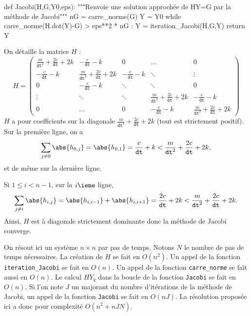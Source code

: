 \question{}

\begin{pyverbatim}
def Jacobi(H,G,Y0,eps):
    """Renvoie une solution approchée de HY=G par la méthode de Jacobi"""
    nG = carre_norme(G)
    Y = Y0
    while carre_norme(H.dot(Y)-G) > eps**2 * nG : 
        Y = iteration_Jacobi(H,G,Y)
    return Y
\end{pyverbatim}

\question{}
On détaille la matrice $H$ : 
\begin{equation*}
  H = \begin{pmatrix}
        \frac{m}{\texttt{dt}^2} + \frac{2c}{\texttt{dt}} + 2k & -\frac{c}{\texttt{dt}} - k & 0 & \dots & 0 \\
        -\frac{c}{\texttt{dt}} - k                            & \frac{m}{\texttt{dt}^2} + \frac{2c}{\texttt{dt}} + 2k & -\frac{c}{\texttt{dt}} - k & \ddots & \vdots  \\
        0 & -\frac{c}{\texttt{dt}} - k & \ddots & \ddots & 0 \\
        \vdots & \ddots & \ddots &\frac{m}{\texttt{dt}^2} + \frac{2c}{\texttt{dt}} + 2k & -\frac{c}{\texttt{dt}} - k \\
        0 & \dots & 0 & -\frac{c}{\texttt{dt}} - k & \frac{m}{\texttt{dt}^2} + \frac{2c}{\texttt{dt}} + 2k 
      \end{pmatrix}
\end{equation*}
$H$ a pour coefficients sur la diagonale $\frac{m}{\texttt{dt}^2} + \frac{2c}{\texttt{dt}} + 2k$ (tout est strictement positif). 
Sur la première ligne, on a 
\begin{equation*}
  \sum_{j\neq 0} \abs{h_{0,j}} = \abs{h_{0,1}} = \frac{c}{\texttt{dt}} + k < \frac{m}{\texttt{dt}^2} + \frac{2c}{\texttt{dt}} + 2k,
\end{equation*}
et de même sur la dernière ligne.

Si $1 \leq i < n-1$, sur la $i\ieme$ ligne,
\begin{equation*}
  \sum_{j\neq i} \abs{h_{i,j}} = \abs{h_{i,i-1}}+\abs{h_{i,i+1}} = \frac{2c}{\texttt{dt}} + 2k < \frac{m}{\texttt{dt}^2} + \frac{2c}{\texttt{dt}} + 2k.
\end{equation*}
Ainsi, $H$ est à diagonale strictement dominante donc la méthode de Jacobi converge.

\question{} On résout ici un système $n\times n$ par pas de temps.
Notons $N$ le nombre de pas de temps nécessaires. 
La création de $H$ se fait en $O(n^2)$.
Un appel de la fonction \texttt{iteration\_Jacobi} se fait en $O(n)$.
Un appel de la fonction \texttt{carre\_norme} se fait aussi en $O(n)$.
Le calcul $HY_q$ dans la boucle de la fonction \texttt{Jacobi} se fait en $O(n)$.
Si l'on note $J$ un majorant du nombre d'itérations de la méthode de Jacobi, un appel de la fonction \texttt{Jacobi} se fait en $O(nJ)$. 
La résolution proposée ici a donc pour complexité $O(n^2+nJN)$.

